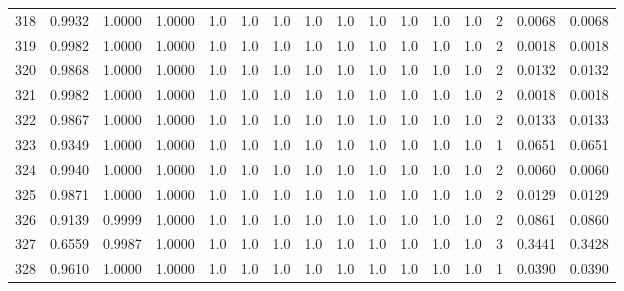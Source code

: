 \begin{tabular}{lrrrrrrrrrrrrrrr}
318 &      0.9932 &  1.0000 &  1.0000 &     1.0 &     1.0 &     1.0 &     1.0 &     1.0 &     1.0 &     1.0 &      1.0 &        1.0 &      2 &                    0.0068 &                     0.0068 \\
319 &      0.9982 &  1.0000 &  1.0000 &     1.0 &     1.0 &     1.0 &     1.0 &     1.0 &     1.0 &     1.0 &      1.0 &        1.0 &      2 &                    0.0018 &                     0.0018 \\
320 &      0.9868 &  1.0000 &  1.0000 &     1.0 &     1.0 &     1.0 &     1.0 &     1.0 &     1.0 &     1.0 &      1.0 &        1.0 &      2 &                    0.0132 &                     0.0132 \\
321 &      0.9982 &  1.0000 &  1.0000 &     1.0 &     1.0 &     1.0 &     1.0 &     1.0 &     1.0 &     1.0 &      1.0 &        1.0 &      2 &                    0.0018 &                     0.0018 \\
322 &      0.9867 &  1.0000 &  1.0000 &     1.0 &     1.0 &     1.0 &     1.0 &     1.0 &     1.0 &     1.0 &      1.0 &        1.0 &      2 &                    0.0133 &                     0.0133 \\
323 &      0.9349 &  1.0000 &  1.0000 &     1.0 &     1.0 &     1.0 &     1.0 &     1.0 &     1.0 &     1.0 &      1.0 &        1.0 &      1 &                    0.0651 &                     0.0651 \\
324 &      0.9940 &  1.0000 &  1.0000 &     1.0 &     1.0 &     1.0 &     1.0 &     1.0 &     1.0 &     1.0 &      1.0 &        1.0 &      2 &                    0.0060 &                     0.0060 \\
325 &      0.9871 &  1.0000 &  1.0000 &     1.0 &     1.0 &     1.0 &     1.0 &     1.0 &     1.0 &     1.0 &      1.0 &        1.0 &      2 &                    0.0129 &                     0.0129 \\
326 &      0.9139 &  0.9999 &  1.0000 &     1.0 &     1.0 &     1.0 &     1.0 &     1.0 &     1.0 &     1.0 &      1.0 &        1.0 &      2 &                    0.0861 &                     0.0860 \\
327 &      0.6559 &  0.9987 &  1.0000 &     1.0 &     1.0 &     1.0 &     1.0 &     1.0 &     1.0 &     1.0 &      1.0 &        1.0 &      3 &                    0.3441 &                     0.3428 \\
328 &      0.9610 &  1.0000 &  1.0000 &     1.0 &     1.0 &     1.0 &     1.0 &     1.0 &     1.0 &     1.0 &      1.0 &        1.0 &      1 &                    0.0390 &                     0.0390 \\

\end{tabular}
